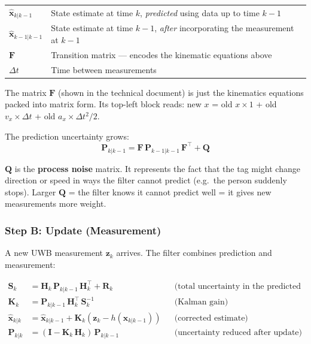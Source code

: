 \documentclass[11pt,a4paper]{article}
\newcommand{\vect}[1]{\bm{#1}}
\newcommand{\mat}[1]{\mathbf{#1}}
\begin{document}
\begin{symbols}
\begin{tabular}{ll}
$\hat{\vect{x}}_{k|k-1}$ & State estimate at time $k$, \emph{predicted} using data up to time $k-1$ \\
$\hat{\vect{x}}_{k-1|k-1}$ & State estimate at time $k-1$, \emph{after} incorporating the measurement at $k-1$ \\
$\mat{F}$ & Transition matrix --- encodes the kinematic equations above \\
$\Delta t$ & Time between measurements \\
\end{tabular}
\end{symbols}

The matrix $\mat{F}$ (shown in the technical document) is just the kinematics equations packed into matrix form. Its top-left block reads: new $x$ = old $x \times 1$ + old $v_x \times \Delta t$ + old $a_x \times \Delta t^2/2$.

The prediction uncertainty grows:
\begin{equation}
\mat{P}_{k|k-1} = \mat{F}\,\mat{P}_{k-1|k-1}\,\mat{F}^\top + \mat{Q}
\end{equation}

$\mat{Q}$ is the \textbf{process noise} matrix. It represents the fact that the tag might change direction or speed in ways the filter cannot predict (e.g.\ the person suddenly stops). Larger $\mat{Q}$ = the filter knows it cannot predict well = it gives new measurements more weight.

\subsubsection{Step B: Update (Measurement)}

A new UWB measurement $\vect{z}_k$ arrives. The filter combines prediction and measurement:

\begin{align}
\mat{S}_k &= \mat{H}_k\,\mat{P}_{k|k-1}\,\mat{H}_k^\top + \mat{R}_k
  && \text{(total uncertainty in the predicted measurement)} \\
\mat{K}_k &= \mat{P}_{k|k-1}\,\mat{H}_k^\top\,\mat{S}_k^{-1}
  && \text{(Kalman gain)} \\
\hat{\vect{x}}_{k|k} &= \hat{\vect{x}}_{k|k-1} + \mat{K}_k\!\left(\vect{z}_k - h(\hat{\vect{x}}_{k|k-1})\right)
  && \text{(corrected estimate)} \\
\mat{P}_{k|k} &= (\mat{I} - \mat{K}_k\,\mat{H}_k)\,\mat{P}_{k|k-1}
  && \text{(uncertainty reduced after update)}
\end{align}
\end{document}
